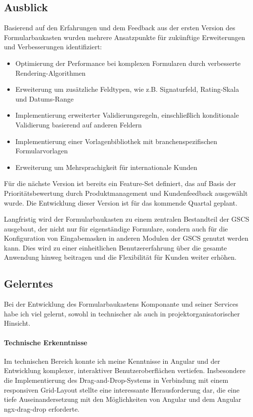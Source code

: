 \documentclass[a4paper,11pt]{article}
\begin{document}
\subsection{Ausblick}
Basierend auf den Erfahrungen und dem Feedback aus der ersten Version des Formularbaukasten wurden mehrere Ansatzpunkte für zukünftige Erweiterungen und Verbesserungen identifiziert:

\begin{itemize}
  \item Optimierung der Performance bei komplexen Formularen durch verbesserte Rendering-Algorithmen
  \item Erweiterung um zusätzliche Feldtypen, wie z.B. Signaturfeld, Rating-Skala und Datums-Range
  \item Implementierung erweiterter Validierungsregeln, einschließlich konditionale Validierung basierend auf anderen Feldern
  \item Implementierung einer Vorlagenbibliothek mit branchenspezifischen Formularvorlagen
  \item Erweiterung um Mehrsprachigkeit für internationale Kunden
\end{itemize}

\noindent Für die nächste Version ist bereits ein Feature-Set definiert, das auf Basis der Prioritätsbewertung durch Produktmanagement und Kundenfeedback ausgewählt wurde. Die Entwicklung dieser Version ist für das kommende Quartal geplant.

\noindent Langfristig wird der Formularbaukasten zu einem zentralen Bestandteil der GSCS ausgebaut, der nicht nur für eigenständige Formulare, sondern auch für die Konfiguration von Eingabemasken in anderen Modulen der GSCS genutzt werden kann. Dies wird zu einer einheitlichen Benutzererfahrung über die gesamte Anwendung hinweg beitragen und die Flexibilität für Kunden weiter erhöhen.

\subsection{Gelerntes}
Bei der Entwicklung des Formularbaukastens Komponante und seiner Services habe ich viel gelernt, sowohl in technischer als auch in projektorganisatorischer Hinsicht.

\paragraph{Technische Erkenntnisse}
Im technischen Bereich konnte ich meine Kenntnisse in Angular und der Entwicklung komplexer, interaktiver Benutzeroberflächen vertiefen. Insbesondere die Implementierung des Drag-and-Drop-Systems in Verbindung mit einem responsiven Grid-Layout stellte eine interessante Herausforderung dar, die eine tiefe Auseinandersetzung mit den Möglichkeiten von Angular und dem Angular ngx-drag-drop erforderte.
\end{document}
